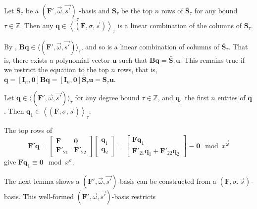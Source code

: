\begin{cor}
\label{cor:linearCombinationOfFirstnRows}Let $\bar{\mathbf{S}}_{\tau}$
be a $(\mathbf{F}',\vec{\omega},\vec{s'})_{\tau}$-basis and $\mathbf{S}_{\tau}$
be the top $n$ rows of $\bar{\mathbf{S}}_{\tau}$ for any bound $\tau\in\mathbb{Z}$.
Then any $\mathbf{q}\in\left\langle \left(\mathbf{F},\sigma,\vec{s}\right)\right\rangle _{\tau}$
is a linear combination of the columns of $\mathbf{S}_{\tau}$.\end{cor}
\begin{pf}
By , $\mathbf{B}\mathbf{q}\in\langle(\mathbf{F}',\vec{\omega},\vec{s'})\rangle_{\tau}$,
and so is a linear combination of columns of $\bar{\mathbf{S}}_{\tau}$.
That is, there exists a polynomial vector $\mathbf{u}$ such that
$\mathbf{B}\mathbf{q}=\bar{\mathbf{S}}_{\tau}\mathbf{u}$. This remains
true if we restrict the equation to the top $n$ rows, that is, $\mathbf{q}=\left[\mathbf{I}_{n},\mathbf{0}\right]\mathbf{B}\mathbf{q}=\left[\mathbf{I}_{n},\mathbf{0}\right]\bar{\mathbf{S}}_{\tau}\mathbf{u}=\mathbf{S}_{\tau}\mathbf{u}$.\end{pf}
\begin{lem}
\label{lem:bqToqOrder}Let $\bar{\mathbf{q}}\in\langle(\mathbf{F}',\vec{\omega},\vec{s'})\rangle_{\tau}$
for any degree bound $\tau\in\mathbb{Z}$, and $\mathbf{q}_{1}$ the
first $n$ entries of $\mathbf{\bar{q}}$. Then $\mathbf{q}_{1}\in\left\langle \left(\mathbf{F},\sigma,\vec{s}\right)\right\rangle _{\tau}$.\end{lem}
\begin{pf}
The top rows of \[
\mathbf{F}'\mathbf{q}=\left[\begin{array}{cc}
\mathbf{F} & \mathbf{0}\\
\mathbf{F}'_{21} & \mathbf{F}'_{22}\end{array}\right]\left[\begin{array}{c}
\mathbf{q}_{1}\\
\mathbf{q}_{2}\end{array}\right]=\begin{bmatrix}\mathbf{F}\mathbf{q}_{1}\\
\mathbf{F}'_{21}\mathbf{q}_{1}+\mathbf{F}'_{22}\mathbf{q}_{2}\end{bmatrix}\equiv\mathbf{0}\mod x^{\vec{\omega}}\]
 give $\mathbf{F}\mathbf{q}_{1}\equiv\mathbf{0}\mod x^{\sigma}$. 
\end{pf}
The next lemma shows a $(\mathbf{F}',\vec{\omega},\vec{s'})$-basis
can be constructed from a $\left(\mathbf{F},\sigma,\vec{s}\right)$-basis.
This well-formed $(\mathbf{F}',\vec{\omega},\vec{s'})$-basis restricts
